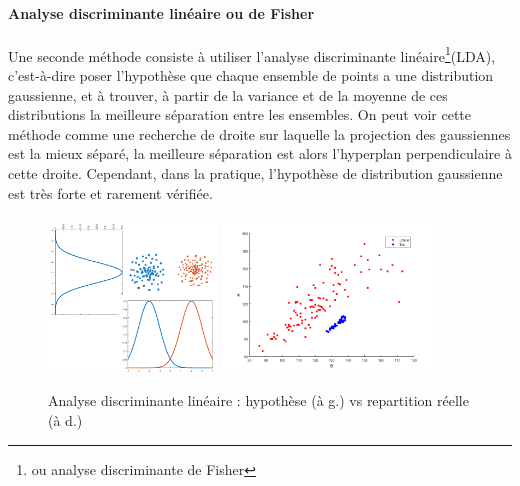 \documentclass[a4paper,10pt]{article}
\begin{document}
\paragraph{Analyse discriminante linéaire ou de Fisher}
\paragraph{}
  Une seconde méthode consiste à utiliser l'analyse discriminante linéaire\footnote{ou analyse discriminante de Fisher}(LDA), c'est-à-dire poser l'hypothèse que chaque ensemble de points a une distribution gaussienne, et à trouver, à partir de la variance et de la moyenne de ces distributions la meilleure séparation entre les ensembles. On peut voir cette méthode comme une recherche de droite sur laquelle la projection des gaussiennes est la mieux séparé, la meilleure séparation est alors l'hyperplan perpendiculaire à cette droite. Cependant, dans la pratique, l'hypothèse de distribution gaussienne est très forte et rarement vérifiée.

\begin{figure}[H]
  \centering
    \includegraphics[width=0.4\textwidth]{ml_lda}\hfill
    \includegraphics[width=0.5\textwidth]{ml_ldaReel}
  \caption{Analyse discriminante linéaire : hypothèse (à g.) vs repartition réelle (à d.)}
  \label{fig:ml_lda}
\end{figure}
\end{document}

